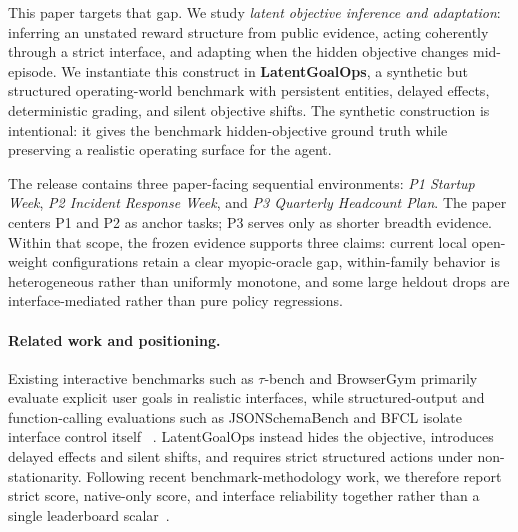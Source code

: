 \documentclass{article}
\begin{document}
This paper targets that gap. We study \emph{latent objective inference and
adaptation}: inferring an unstated reward structure from public evidence,
acting coherently through a strict interface, and adapting when the hidden
objective changes mid-episode. We instantiate this construct in
\textbf{LatentGoalOps}, a synthetic but structured operating-world benchmark
with persistent entities, delayed effects, deterministic grading, and silent
objective shifts. The synthetic construction is intentional: it gives the
benchmark hidden-objective ground truth while preserving a realistic operating
surface for the agent.

The release contains three paper-facing sequential environments:
\emph{P1 Startup Week}, \emph{P2 Incident Response Week}, and
\emph{P3 Quarterly Headcount Plan}. The paper centers P1 and P2 as anchor
tasks; P3 serves only as shorter breadth evidence. Within that scope, the
frozen evidence supports three claims: current local open-weight
configurations retain a clear myopic-oracle gap, within-family behavior is
heterogeneous rather than uniformly monotone, and some large heldout drops are
interface-mediated rather than pure policy regressions.

\paragraph{Related work and positioning.}
Existing interactive benchmarks such as \textsc{$\tau$}-bench and BrowserGym
primarily evaluate explicit user goals in realistic interfaces, while
structured-output and function-calling evaluations such as
JSONSchemaBench and BFCL isolate interface control itself
~\citep{taubench,browsergym,jsonschemabench,bfcl}. LatentGoalOps instead hides
the objective, introduces delayed effects and silent shifts, and requires
strict structured actions under non-stationarity. Following recent
benchmark-methodology work, we therefore report strict score, native-only
score, and interface reliability together rather than a single leaderboard
scalar~\citep{agentrewardbench,betterbench,dataperf,benchmarkrepos}.
\end{document}
